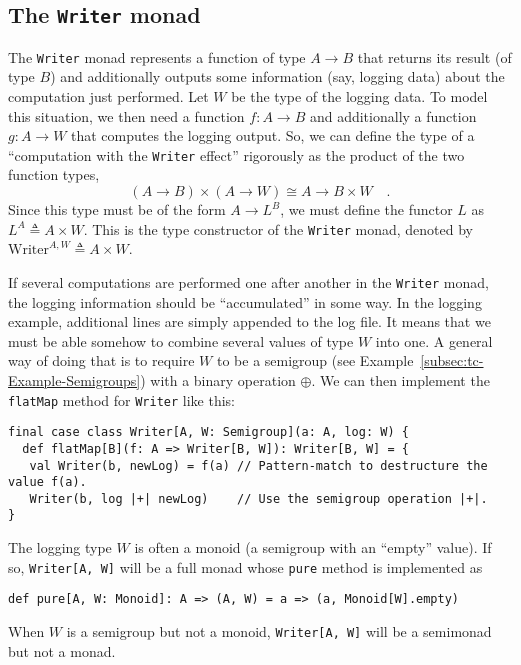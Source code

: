 \subsection{The \texttt{Writer} monad}

The \lstinline!Writer!
monad represents a function of type $A\rightarrow B$ that returns
its result (of type $B$) and additionally outputs some information
(say, logging data) about the computation just performed. Let $W$
be the type of the logging data. To model this situation, we then
need a function $f:A\rightarrow B$ and additionally a function $g:A\rightarrow W$
that computes the logging output. So, we can define the type of a
\textsf{``}computation with the \lstinline!Writer! effect\textsf{''} rigorously as
the product of the two function types,
\[
\left(A\rightarrow B\right)\times\left(A\rightarrow W\right)\cong A\rightarrow B\times W\quad.
\]
Since this type must be of the form $A\rightarrow L^{B}$, we must
define the functor $L$ as $L^{A}\triangleq A\times W$. This is the
type constructor of the \lstinline!Writer! monad, denoted by $\text{Writer}^{A,W}\triangleq A\times W$.

If several computations are performed one after another in the \lstinline!Writer!
monad, the logging information should be \textsf{``}accumulated\textsf{''} in some
way. In the logging example, additional lines are simply appended
to the log file. It means that we must be able somehow to combine
several values of type $W$ into one. A general way of doing that
is to require $W$ to be a semigroup (see Example~\ref{subsec:tc-Example-Semigroups})
with a binary operation $\oplus$. We can then implement the \lstinline!flatMap!
method for \lstinline!Writer! like this:
\begin{lstlisting}
final case class Writer[A, W: Semigroup](a: A, log: W) {
  def flatMap[B](f: A => Writer[B, W]): Writer[B, W] = {
   val Writer(b, newLog) = f(a) // Pattern-match to destructure the value f(a).
   Writer(b, log |+| newLog)    // Use the semigroup operation |+|.
}
\end{lstlisting}
\begin{comment}
\[
\text{flm}_{\text{Write}}(f^{:A\rightarrow B\times W})\triangleq a\times w\rightarrow\left(\pi_{1}f(a)\right)\times\left(w\oplus\pi_{2}f(a)\right)\quad.
\]
\end{comment}

The logging type $W$ is often a monoid (a semigroup with an \textsf{``}empty\textsf{''}
value). If so, \lstinline!Writer[A, W]! will be a full monad whose
\lstinline!pure! method is implemented as
\begin{lstlisting}
def pure[A, W: Monoid]: A => (A, W) = a => (a, Monoid[W].empty)
\end{lstlisting}
When $W$ is a semigroup but not a monoid, \lstinline!Writer[A, W]!
will be a semimonad but not a monad. 

